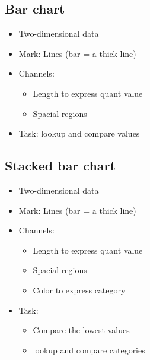 \subsection{Bar chart}
\begin{definition}
    
    \begin{itemize}
        \item Two-dimensional data
        \item Mark: Lines (bar = a thick line)
        \item Channels:
            \begin{itemize}
                \item Length to express quant value
                \item Spacial regions
            \end{itemize}
        \item Task: lookup and compare values
    \end{itemize}
\end{definition}

\subsection{Stacked bar chart}
\begin{definition}
    
    \begin{itemize}
        \item Two-dimensional data
        \item Mark: Lines (bar = a thick line)
        \item Channels:
            \begin{itemize}
                \item Length to express quant value
                \item Spacial regions
                \item Color to express category
            \end{itemize}
        \item Task: 
            \begin{itemize}
                \item Compare the lowest values
                \item lookup and compare categories
            \end{itemize}
    \end{itemize}
\end{definition}

